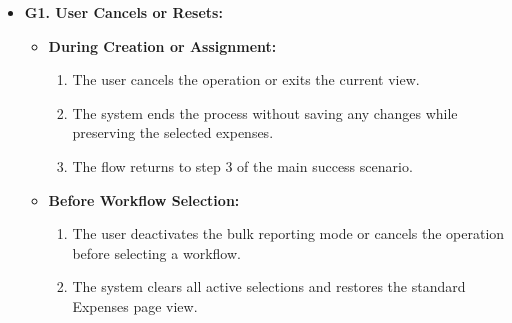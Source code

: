 \begin{itemize} [label={}, leftmargin=0.75cm, noitemsep]
    \item \textbf{G1. User Cancels or Resets:}

    \begin{itemize} [label={}, leftmargin=0.75cm, noitemsep]
        \item \textbf{During Creation or Assignment:}
        \begin{enumerate} [leftmargin=0.75cm, noitemsep]
            \item The user cancels the operation or exits the current view.
            \item The system ends the process without saving any changes while preserving the selected expenses.
            \item The flow returns to step 3 of the main success scenario.
        \end{enumerate}

        \item \textbf{Before Workflow Selection:}
        \begin{enumerate} [leftmargin=0.75cm, noitemsep]
            \item The user deactivates the bulk reporting mode or cancels the operation before selecting a workflow.
            \item The system clears all active selections and restores the standard Expenses page view.
        \end{enumerate}
    \end{itemize}
\end{itemize}

\vspace{0.3cm}